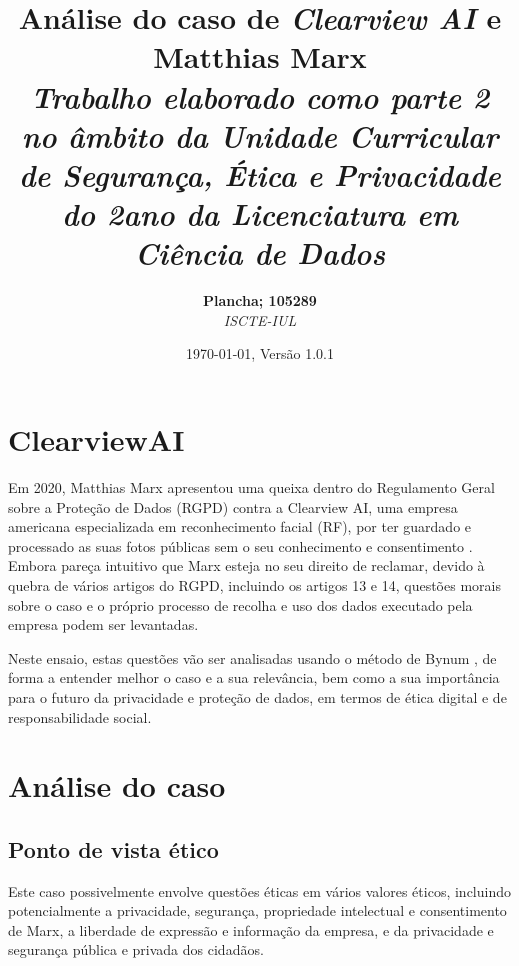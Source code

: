 \documentclass[12pt]{../diazessay}
\title{\textbf{Análise do caso de \textit{Clearview AI} e Matthias Marx} \\ {\Large\itshape Trabalho elaborado como parte 2 no âmbito da Unidade Curricular de Segurança, Ética e Privacidade do 2\textdegree ano da Licenciatura em Ciência de Dados}}
\author{\textbf{Plancha; 105289} \\ \textit{ISCTE-IUL}}
\date{\today , Versão 1.0.1}
\begin{document}
\maketitle

\section*{ClearviewAI}
Em 2020, Matthias Marx apresentou uma queixa dentro do Regulamento Geral sobre a Proteção de Dados (RGPD) contra a Clearview AI, uma empresa americana especializada em reconhecimento facial (RF), por ter guardado e processado as suas fotos públicas sem o seu conhecimento e consentimento \parencite{wired}. Embora pareça intuitivo que Marx esteja no seu direito de reclamar, devido à quebra de vários artigos do RGPD, incluindo os artigos 13 e 14, questões morais sobre o caso e o próprio processo de recolha e uso dos dados executado pela empresa podem ser levantadas.

Neste ensaio, estas questões vão ser analisadas usando o método de Bynum \parencite{Bynum}, de forma a entender melhor o caso e a sua relevância, bem como a sua importância para o futuro da privacidade e proteção de dados, em termos de ética digital e de responsabilidade social.

\section*{Análise do caso}
\subsection*{Ponto de vista ético}
Este caso possivelmente envolve questões éticas em vários valores éticos, incluindo potencialmente a privacidade, segurança, propriedade intelectual e consentimento de Marx, a liberdade de expressão e informação da empresa, e da privacidade e segurança pública e privada dos cidadãos.
\end{document}
